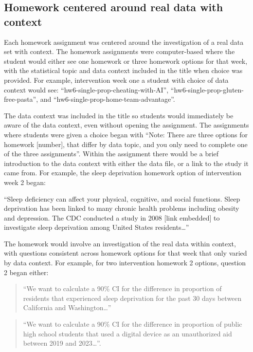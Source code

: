 \documentclass[
  12pt]{article}
\begin{document}
\subsection{Homework centered around real data with
context}\label{homework-centered-around-real-data-with-context}

Each homework assignment was centered around the investigation of a real
data set with context. The homework assignments were computer-based
where the student would either see one homework or three homework
options for that week, with the statistical topic and data context
included in the title when choice was provided. For example,
intervention week one a student with choice of data context would see:
``hw6-single-prop-cheating-with-AI'',
``hw6-single-prop-gluten-free-pasta'', and
``hw6-single-prop-home-team-advantage''.

The data context was included in the title so students would immediately
be aware of the data context, even without opening the assignment. The
assignments where students were given a choice began with ``Note: There
are three options for homework {[}number{]}, that differ by data topic,
and you only need to complete one of the three assignments''. Within the
assignment there would be a brief introduction to the data context with
either the data file, or a link to the study it came from. For example,
the sleep deprivation homework option of intervention week 2 began:

``Sleep deficiency can affect your physical, cognitive, and social
functions. Sleep deprivation has been linked to many chronic health
problems including obesity and depression. The CDC conducted a study in
2008 {[}link embedded{]} to investigate sleep deprivation among United
States residents\ldots{}''

The homework would involve an investigation of the real data within
context, with questions consistent across homework options for that week
that only varied by data context. For example, for two intervention
homework 2 options, question 2 began either:

\begin{quote}
``We want to calculate a 90\% CI for the difference in proportion of
residents that experienced sleep deprivation for the past 30 days
between California and Washington\ldots{}''
\end{quote}

\begin{quote}
``We want to calculate a 90\% CI for the difference in proportion of
public high school students that used a digital device as an
unauthorized aid between 2019 and 2023\ldots{}''.
\end{quote}
\end{document}
